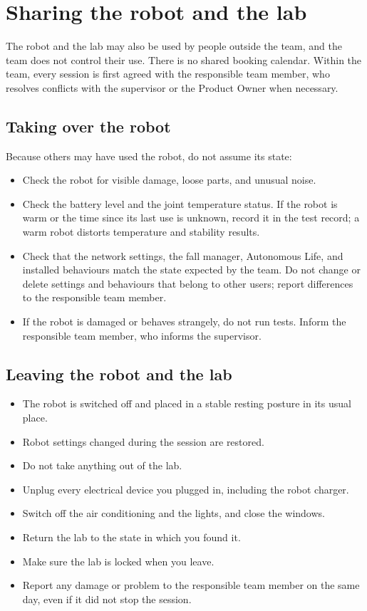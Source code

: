 \documentclass[12pt,a4paper]{article}
\begin{document}
\section{Sharing the robot and the lab}
\label{sec:sharing}

The robot and the lab may also be used by people outside the team, and the team does not control their use. There is no shared booking calendar. Within the team, every session is first agreed with the responsible team member, who resolves conflicts with the supervisor or the Product Owner when necessary.

\subsection{Taking over the robot}

Because others may have used the robot, do not assume its state:

\begin{itemize}
\item Check the robot for visible damage, loose parts, and unusual noise.
\item Check the battery level and the joint temperature status. If the robot is warm or the time since its last use is unknown, record it in the test record; a warm robot distorts temperature and stability results.
\item Check that the network settings, the fall manager, Autonomous Life, and installed behaviours match the state expected by the team. Do not change or delete settings and behaviours that belong to other users; report differences to the responsible team member.
\item If the robot is damaged or behaves strangely, do not run tests. Inform the responsible team member, who informs the supervisor.
\end{itemize}

\subsection{Leaving the robot and the lab}

\begin{itemize}
\item The robot is switched off and placed in a stable resting posture in its usual place.
\item Robot settings changed during the session are restored.
\item Do not take anything out of the lab.
\item Unplug every electrical device you plugged in, including the robot charger.
\item Switch off the air conditioning and the lights, and close the windows.
\item Return the lab to the state in which you found it.
\item Make sure the lab is locked when you leave.
\item Report any damage or problem to the responsible team member on the same day, even if it did not stop the session.
\end{itemize}
\end{document}
